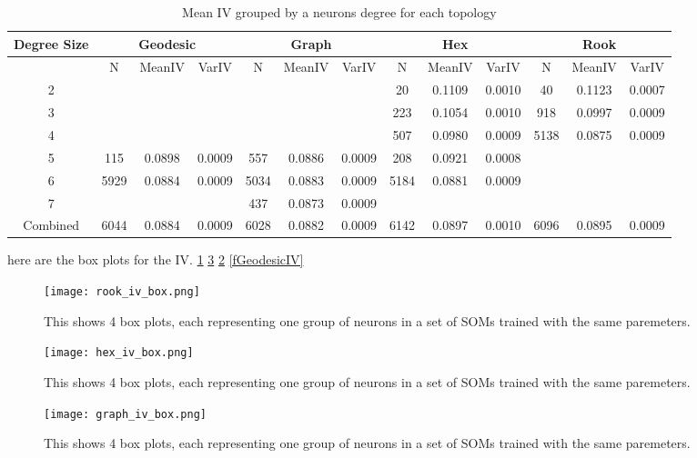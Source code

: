 \begin{table}
\caption{Mean IV grouped by a neurons degree for each topology}
\label{meanvar1}
\begin{tabular}{|c||c|c|c||c|c|c||c|c|c||c|c|c|}
\hline
\textbf{Degree Size} & \multicolumn{3}{c||}{\textbf{Geodesic}} &
\multicolumn{3}{c||}{\textbf{Graph}} & \multicolumn{3}{c||}{\textbf{Hex}} &
\multicolumn{3}{c||}{\textbf{Rook}} \\
\hline
& N & MeanIV & VarIV & N & MeanIV & VarIV & N & MeanIV & VarIV & N & MeanIV &
VarIV \\
\hline
2&&&&&&& 20& 0.1109& 0.0010& 40& 0.1123& 0.0007\\ 
3&&&&&&& 223& 0.1054& 0.0010& 918& 0.0997& 0.0009\\ 
4&&&&&&& 507& 0.0980& 0.0009& 5138& 0.0875& 0.0009\\ 
5& 115& 0.0898& 0.0009& 557& 0.0886& 0.0009& 208& 0.0921& 0.0008&&&\\ 
6& 5929& 0.0884& 0.0009& 5034& 0.0883& 0.0009& 5184& 0.0881& 0.0009&&&\\ 
7&&&& 437& 0.0873& 0.0009&&&&&&\\ 
\hline 
Combined& 6044& 0.0884& 0.0009& 6028& 0.0882& 0.0009& 6142& 0.0897& 0.0010&
6096& 0.0895& 0.0009\\ 
\hline
\end{tabular} \end{table}




here are the box plots for the IV. \ref{fRookIV} \ref{fGraphIV} \ref{fHexIV}
\ref{fGeodesicIV}


\begin{figure}
\centering
\texttt{[image: rook\_iv\_box.png]}
\caption{This shows 4 box plots, each representing one group of neurons in a set
of SOMs trained with the same paremeters.}
\label{fRookIV}
\end{figure}

\begin{figure}
\centering
\texttt{[image: hex\_iv\_box.png]}
\caption{This shows 4 box plots, each representing one group of neurons in a set
of SOMs trained with the same paremeters.}
\label{fHexIV}
\end{figure}

\begin{figure}
\centering
\texttt{[image: graph\_iv\_box.png]}
\caption{This shows 4 box plots, each representing one group of neurons in a set
of SOMs trained with the same paremeters.}
\label{fGraphIV}
\end{figure}

